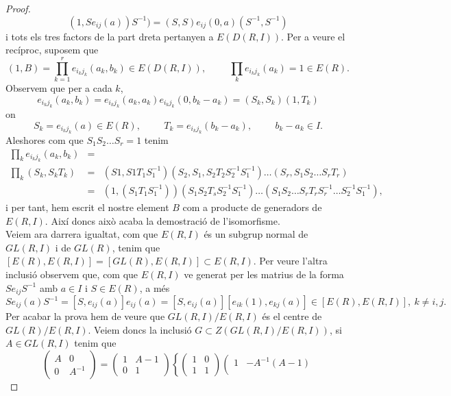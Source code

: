 \begin{proof}
$$
(1, Se_{ij}(a))S^{-1}) = (S,S) e_{ij}(0,a)(S^{-1},S^{-1})
$$
i tots els tres factors de la part dreta pertanyen a $E(D(R,I))$. Per a veure el recíproc, suposem que
$$
(1,B) = \prod_{k=1}^r e_{i_kj_k}(a_k,b_k) \in E(D(R,I)), \hspace{1cm} \prod_k e_{i_kj_k}(a_k)=1\in E(R).
$$
Observem que per a cada $k$,
$$
e_{i_kj_k}(a_k,b_k) = e_{i_kj_k}(a_k,a_k)e_{i_kj_k}(0,b_k-a_k) = (S_k,S_k)(1,T_k)
$$
on
$$
S_k = e_{i_kj_k}(a) \in E(R), \hspace{1cm} T_k=e_{i_kj_k}(b_k-a_k), \hspace{1cm} b_k-a_k \in I.
$$
Aleshores com que $S_1S_2\dots S_r =1$ tenim
\begin{eqnarray*}
\prod_k e_{i_kj_k}(a_k,b_k) &=& \\ \prod_k (S_k, S_kT_k) &=& (S1, S1T_1S_1^{-1})(S_2,S_1,S_2T_2S_2^{-1}S_1^{-1}) 
\hdots (S_r, S_1S_2\dots S_rT_r) \\
&=& (1,(S_1T_1S_1^{-1}))(S_1S_2T_sS_2^{-1}S_1^{-1}) \hdots (S_1S_2\hdots S_rT_rS_r^{-1}\hdots S_2^{-1}S_1^{-1}),
\end{eqnarray*}
i per tant, hem escrit el nostre element $B$ com a producte de generadors de $E(R,I)$. Així doncs això acaba la demostració de l'isomorfisme. \\
\indent Veiem ara darrera igualtat, com que $E(R,I)$ és un subgrup normal de $GL(R,I)$ i de $GL(R)$, tenim que  $[E(R), E(R,I)] = [GL(R), E(R,I)] \subset E(R,I)$. Per veure l'altra inclusió observem que, com que $E(R,I)$ ve generat per les matrius de la forma $Se_{ij}S^{-1}$ amb $a\in I$ i $S\in E(R)$, a més
$$
Se_{ij}(a)S^{-1} = [S,e_{ij}(a)]e_{ij}(a) = [S,e_{ij}(a)][e_{ik}(1), e_{kj}(a)] \in [E(R), E(R,I)], \ k \neq i,j.
$$
\indent Per acabar la prova hem de veure que $GL(R,I)/E(R,I)$ és el centre de $GL(R)/E(R,I)$. Veiem doncs la inclusió $G \subset Z(GL(R,I)/E(R,I))$, si $A\in GL(R,I)$ tenim que 
$$
\left( \begin{matrix}
  A & 0 \\
  0 & A^{-1}
 \end{matrix} \right) =  
 \left( \begin{matrix}
  1 & A-1 \\
  0 & 1
 \end{matrix} \right)
 \left \{
 \left( \begin{matrix}
  1 & 0 \\
  1 & 1
 \end{matrix} \right)
  \left( \begin{matrix}
  1 & -A^{-1}(A-1) \\

\end{matrix}$$
\end{proof}
